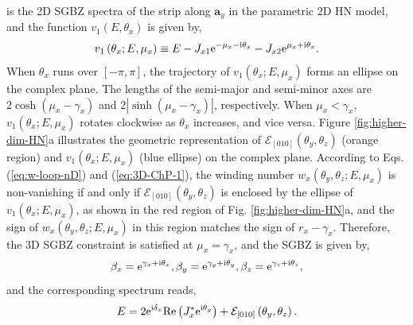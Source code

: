 \documentclass[pdflatex,sn-nature, iicol]{sn-jnl}%
\theoremstyle{thmstyleone}%
\theoremstyle{thmstyletwo}%
\theoremstyle{thmstylethree}%
\begin{document}
is the 2D SGBZ spectra of the strip along $\mathbf{a}_{y}$ in the
parametric 2D HN model, and the function $v_{1}(E,\theta_{x})$ is
given by, 
\begin{equation}
v_{1}\left(\theta_{x};E,\mu_{x}\right)\equiv E-J_{x1}\mathrm{e}^{-\mu_{x}-\mathrm{i}\theta_{x}}-J_{x2}\mathrm{e}^{\mu_{x}+\mathrm{i}\theta_{x}}.
\end{equation}
When $\theta_{x}$ runs over $\left[-\pi,\pi\right]$, the trajectory
of $v_{1}(\theta_{x};E,\mu_{x})$ forms an ellipse on the complex
plane. The lengths of the semi-major and semi-minor axes are $2\cosh(\mu_{x}-\gamma_{x})$
and $2|\sinh(\mu_{x}-\gamma_{x})|$, respectively. When $\mu_{x}<\gamma_{x}$,
$v_{1}(\theta_{x};E,\mu_{x})$ rotates clockwise as $\theta_{x}$
increases, and vice versa. Figure \ref{fig:higher-dim-HN}a illustrates
the geometric representation of $\mathcal{E}_{[010]}(\theta_{y},\theta_{z})$
(orange region) and $v_{1}(\theta_{x};E,\mu_{x})$ (blue ellipse)
on the complex plane. According to Eqs. (\ref{eq:w-loop-nD}) and
(\ref{eq:3D-ChP-1}), the winding number $w_{x}(\theta_{y},\theta_{z};E,\mu_{x})$
is non-vanishing if and only if $\mathcal{E}_{[010]}(\theta_{y},\theta_{z})$
is enclosed by the ellipse of $v_{1}(\theta_{x};E,\mu_{x})$, as shown
in the red region of Fig. \ref{fig:higher-dim-HN}a, and the sign
of $w_{x}(\theta_{y},\theta_{z};E,\mu_{x})$ in this region matches
the sign of $r_{x}-\gamma_{x}$. Therefore, the 3D SGBZ constraint
is satisfied at $\mu_{x}=\gamma_{x}$, and the SGBZ is given by, 
\begin{equation}
\beta_{x}=\mathrm{e}^{\gamma_{x}+\mathrm{i}\theta_{x}},\beta_{y}=\mathrm{e}^{\gamma_{y}+\mathrm{i}\theta_{y}},\beta_{z}=\mathrm{e}^{\gamma_{z}+\mathrm{i}\theta_{z}},
\end{equation}
and the corresponding spectrum reads, 
\begin{equation}
E=2\mathrm{e}^{\mathrm{i}\delta_{x}}\text{Re}\left(J_{x}^{*}\mathrm{e}^{\mathrm{i}\theta_{y}}\right)+\mathcal{E}_{[010]}\left(\theta_{y},\theta_{z}\right).
\end{equation}
\end{document}
